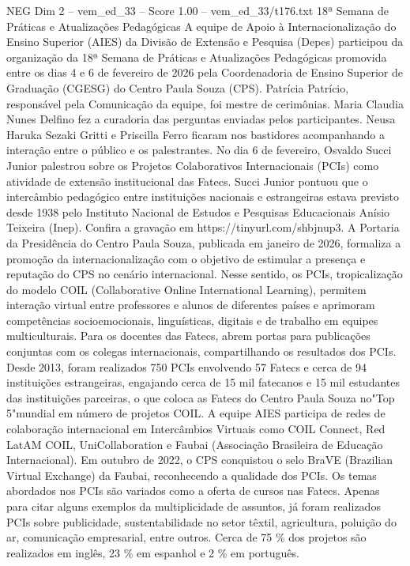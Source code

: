 \begin{textsample}{NEG Dim 2 – vem\_ed\_33 – Score 1.00 – vem\_ed\_33/t176.txt}  \label{ex:f2_neg_033}
18ª Semana de Práticas e Atualizações Pedagógicas A equipe de Apoio à Internacionalização do Ensino Superior (AIES) da Divisão de Extensão e Pesquisa (Depes) participou da organização da 18ª Semana de Práticas e Atualizações Pedagógicas promovida entre os dias 4 e 6 de fevereiro de 2026 pela Coordenadoria de Ensino Superior de Graduação (CGESG) do Centro Paula Souza (CPS).
Patrícia Patrício, responsável pela Comunicação da equipe, foi mestre de cerimônias.
Maria Claudia Nunes Delfino fez a curadoria das perguntas enviadas pelos participantes.
Neusa Haruka Sezaki Gritti e Priscilla Ferro ficaram nos bastidores acompanhando a interação entre o público e os palestrantes.
No dia 6 de fevereiro, Osvaldo Succi Junior palestrou sobre os Projetos Colaborativos Internacionais (PCIs) como atividade de extensão institucional das Fatecs.
Succi Junior pontuou que o intercâmbio pedagógico entre instituições nacionais e estrangeiras estava previsto desde 1938 pelo Instituto Nacional de Estudos e Pesquisas Educacionais Anísio Teixeira (Inep).
Confira a gravação em https://tinyurl.com/shbjnup3.
A Portaria da Presidência do Centro Paula Souza, publicada em janeiro de 2026, formaliza a promoção da internacionalização com o objetivo de estimular a presença e reputação do CPS no cenário internacional.
Nesse sentido, os PCIs, tropicalização do modelo COIL (Collaborative Online International Learning), permitem interação virtual entre professores e alunos de diferentes países e aprimoram competências socioemocionais, linguísticas, digitais e de trabalho em equipes multiculturais.
Para os docentes das Fatecs, abrem portas para publicações conjuntas com os colegas internacionais, compartilhando os resultados dos PCIs.
Desde 2013, foram realizados 750 PCIs envolvendo 57 Fatecs e cerca de 94 instituições estrangeiras, engajando cerca de 15 mil fatecanos e 15 mil estudantes das instituições parceiras, o que coloca as Fatecs do Centro Paula Souza no"Top 5"mundial em número de projetos COIL.
A equipe AIES participa de redes de colaboração internacional em Intercâmbios Virtuais como COIL Connect, Red LatAM COIL, UniCollaboration e Faubai (Associação Brasileira de Educação Internacional).
Em outubro de 2022, o CPS conquistou o selo BraVE (Brazilian Virtual Exchange) da Faubai, reconhecendo a qualidade dos PCIs.
Os temas abordados nos PCIs são variados como a oferta de cursos nas Fatecs.
Apenas para citar alguns exemplos da multiplicidade de assuntos, já foram realizados PCIs sobre publicidade, sustentabilidade no setor têxtil, agricultura, poluição do ar, comunicação empresarial, entre outros.
Cerca de 75 \% dos projetos são realizados em inglês, 23 \% em espanhol e 2 \% em português.

\end{textsample}

